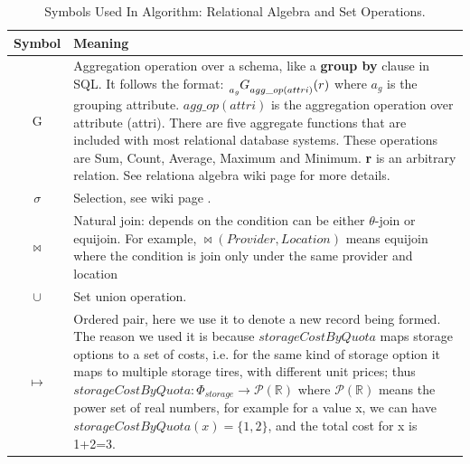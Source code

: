 \begin{table}[!ht]
\begin{center}\caption{Symbols Used In Algorithm: Relational Algebra and Set Operations.} \label{table:relational_algebra_set}
\begin{tabular}{|c|p{10cm}|}
\hline
\textbf{Symbol }& \textbf{Meaning } \\
\hline 
G & 
    Aggregation operation over a schema, like a \textbf{group by} clause in SQL.
    It follows the format:
    $\tensor[_{a_g}]{G}{_{agg\_op(attri)}} (r)$
    where $a_g$ is the grouping attribute.
    $agg\_op(attri)$ is the aggregation operation over attribute (attri). 
    There are five aggregate functions that are included with most relational database systems.
    These operations are Sum, Count, Average, Maximum and Minimum.
    \textbf{r} is an arbitrary relation.
    See relationa algebra wiki page \cite{ref36} for more details.\\
    
\hline $\sigma $ &  Selection, see wiki page \cite{ref36}.\\
\hline $\bowtie$ & Natural join: depends on the condition can be either $\theta$-join or equijoin. For example, $\bowtie(Provider,Location)$ means equijoin where the condition is join only under the same provider and location\\
\hline  $ \cup$  & Set union operation. \\
\hline $\mapsto $ & Ordered pair, here we use it to denote a new record being formed. The reason we used it is because $storageCostByQuota$ maps storage options to a set of costs, i.e. for the same kind of storage option it maps to multiple storage tires, with different unit prices; thus $storageCostByQuota: \Phi _{storage} \to \mathcal{P}(\mathbb{R})$ where $\mathcal{P}(\mathbb{R})$ means the power set of real numbers, for example for a value x, we can have $storageCostByQuota(x)=\{1,2\}$, and the total cost for x is 1+2=3.\\
\hline
\end{tabular}
\end{center}
\end{table}


